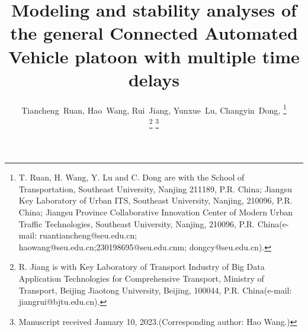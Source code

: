 \documentclass[journal]{IEEEtran}
\begin{document}
\title{Modeling and stability analyses of the general Connected Automated Vehicle platoon with multiple time delays}



\author{Tiancheng~Ruan,
        Hao~Wang,
        Rui~Jiang,
        Yunxue~Lu,
        Changyin~Dong,
\thanks{T. Ruan,  H. Wang, Y. Lu and C. Dong are with the
School of Transportation, Southeast University, Nanjing 211189, P.R. China;
Jiangsu Key Laboratory of Urban ITS, Southeast University, Nanjing, 210096, P.R. China;
Jiangsu Province Collaborative Innovation Center of Modern Urban Traffic Technologies, Southeast University, Nanjing, 210096, P.R. China(e-mail: ruantiancheng@seu.edu.cn;  haowang@seu.edu.cn;230198695@seu.edu.cnm;
dongcy@seu.edu.cn).}%

\thanks{R. Jiang is with Key Laboratory of Transport Industry of Big Data Application Technologies for Comprehensive Transport, Ministry of Transport, Beijing Jiaotong University, Beijing, 100044, P.R. China(e-mail: jiangrui@bjtu.edu.cn).}
\thanks{Manuscript received January 10, 2023.(Corresponding author: Hao Wang.)}}
\end{document}
